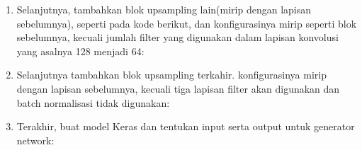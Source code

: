 \begin{enumerate}
\item Selanjutnya, tambahkan blok upsampling lain(mirip dengan lapisan sebelumnya), seperti pada kode berikut, dan konfigurasinya mirip seperti blok sebelumnya, kecuali jumlah filter yang digunakan dalam lapisan konvolusi yang asalnya 128 menjadi 64:
	

\item Selanjutnya tambahkan blok upsampling terkahir. konfigurasinya mirip dengan lapisan sebelumnya, kecuali tiga lapisan filter akan digunakan dan batch normalisasi tidak digunakan:


\item Terakhir, buat model Keras dan tentukan input serta output untuk generator network:


\end{enumerate}

